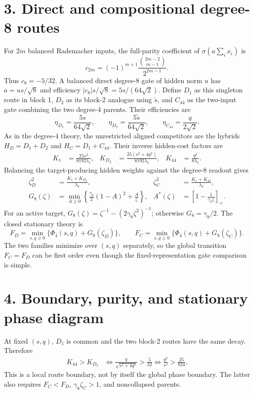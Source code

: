 \documentclass[10pt]{article}
\begin{document}
\section*{3. Direct and compositional degree-8 routes}
For $2m$ balanced Rademacher inputs, the full-parity coefficient of
$\sigma(a\sum_i x_i)$ is
\begin{equation}
c_{2m}=(-1)^{m+1}\frac{\binom{2m-2}{m-1}}{2^{2m-1}}.
\label{eq:general-coefficient}
\end{equation}
Thus $c_8=-5/32$.  A balanced direct degree-8 gate of hidden norm $u$ has
$a=us/\sqrt8$ and efficiency $|c_8|s/\sqrt8=5s/(64\sqrt2)$.  Define $D_1$ as this
singleton route in block 1, $D_2$ as its block-2 analogue using $\widetilde s$, and $C_{44}$
as the two-input gate combining the two degree-4 parents.  Their efficiencies are
\begin{equation}
\eta_{D_1}=\frac{5s}{64\sqrt2},\qquad
\eta_{D_2}=\frac{5\widetilde s}{64\sqrt2},\qquad
\eta_{C_{44}}=\frac{q}{2\sqrt2}.
\label{eq:efficiencies8}
\end{equation}
As in the degree-4 theory, the unrestricted aligned competitors are the hybrids
$H_D=D_1+D_2$ and $H_C=D_1+C_{44}$.  Their inverse hidden-cost factors are
\begin{align}
K_1&=\frac{25s^2}{8192\lambda_1},&
K_{D_2}&=\frac{25(s^2+4q^2)}{8192\lambda_2},&
K_{44}&=\frac{q^2}{8\lambda_2}.
\label{eq:k8}
\end{align}
Balancing the target-producing hidden weights against the degree-8 readout gives
\begin{align}
\zeta_D^2&=\frac{K_1+K_{D_2}}{\lambda_8},&
\zeta_C^2&=\frac{K_1+K_{44}}{\lambda_8},\nonumber\\[-2pt]
G_8(\zeta)&=\min_{A\geq0}\left\{\frac{\gamma_8}{2}(1-A)^2+\frac{A}{\zeta}\right\},&
A^*(\zeta)&=\left[1-\frac1{\gamma_8\zeta}\right]_+.
\label{eq:zeta8}
\end{align}
For an active target,
$G_8(\zeta)=\zeta^{-1}-(2\gamma_8\zeta^2)^{-1}$; otherwise
$G_8=\gamma_8/2$.  The closed stationary theory is
\begin{equation}
\boxed{
F_D=\min_{s,q\geq0}\{\Phi_4(s,q)+G_8(\zeta_D)\},\qquad
F_C=\min_{s,q\geq0}\{\Phi_4(s,q)+G_8(\zeta_C)\}.}
\label{eq:free8}
\end{equation}
The two families minimize over $(s,q)$ separately, so the global transition $F_C=F_D$ can be
first order even though the fixed-representation gate comparison is simple.

\section*{4. Boundary, purity, and stationary phase diagram}
At fixed $(s,q)$, $D_1$ is common and the two block-2 routes have the same decay.  Therefore
\begin{align}
K_{44}>K_{D_2}
&\Longleftrightarrow \frac{q}{\sqrt{s^2+4q^2}}>\frac5{32}
\Longleftrightarrow \frac{q^2}{s^2}>\frac{25}{924}.
\label{eq:boundary8}
\end{align}
This is a local route boundary, not by itself the global phase boundary.  The latter also
requires $F_C<F_D$, $\gamma_8\zeta_C>1$, and noncollapsed parents.
\end{document}
